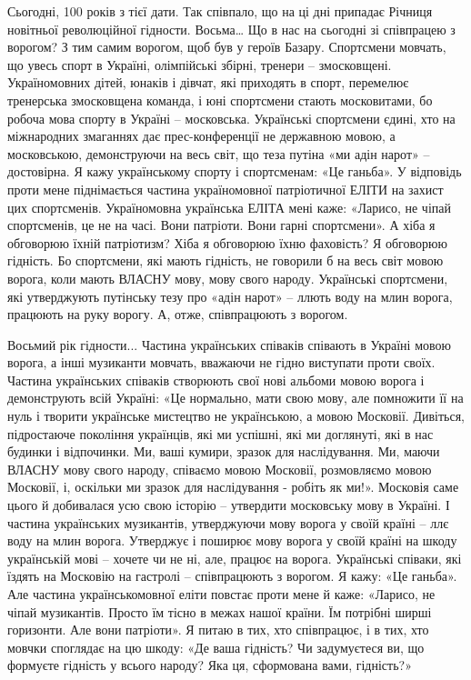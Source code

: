 Сьогодні, 100 років з тієї дати. Так співпало, що на ці дні припадає Річниця
новітньої революційної гідности. Восьма… Що в нас на сьогодні зі співпрацею з
ворогом? З тим самим ворогом, щоб був у героїв Базару. Спортсмени мовчать, що
увесь спорт в Україні, олімпійські збірні, тренери – змосковщені. Україномовних
дітей, юнаків і дівчат, які приходять в спорт, перемелює тренерська змосковщена
команда, і юні спортсмени стають московитами, бо робоча мова спорту в Україні –
московська. Українські спортсмени єдині, хто на міжнародних змаганнях дає
прес-конференції не державною мовою, а московською, демонструючи на весь світ,
що теза путіна «ми адін нарот» – достовірна. Я кажу українському спорту і
спортсменам: «Це ганьба». У відповідь проти мене піднімається частина
україномовної патріотичної ЕЛІТИ на захист цих спортсменів. Україномовна
українська ЕЛІТА мені каже: «Ларисо, не чіпай спортсменів, це не на часі. Вони
патріоти. Вони гарні спортсмени». А хіба я обговорюю їхній патріотизм? Хіба я
обговорюю їхню фаховість? Я обговорюю гідність. Бо спортсмени, які мають
гідність, не говорили б на весь світ мовою ворога, коли мають ВЛАСНУ мову, мову
свого народу. Українські спортсмени, які утверджують путінську тезу про «адін
нарот» – ллють воду на млин ворога, працюють на руку ворогу. А, отже,
співпрацюють з ворогом. 

Восьмий рік гідности... Частина українських співаків співають в Україні мовою
ворога, а інші музиканти мовчать, вважаючи не гідно виступати проти своїх.
Частина українських співаків створюють свої нові альбоми мовою ворога і
демонструють всій Україні: «Це нормально, мати свою мову, але помножити її на
нуль і творити українське мистецтво не українською, а  мовою Московії.
Дивіться, підростаюче покоління українців, які ми успішні, які ми доглянуті,
які в нас будинки і відпочинки. Ми, ваші кумири, зразок для наслідування. Ми,
маючи ВЛАСНУ мову свого народу, співаємо мовою Московії, розмовляємо мовою
Московії, і, оскільки ми зразок для наслідування - робіть як ми!». Московія
саме цього й добивалася усю свою історію – утвердити московську мову в Україні.
І частина українських музикантів, утверджуючи мову ворога у своїй країні – ллє
воду на млин ворога. Утверджує і поширює мову ворога у своїй країні на шкоду
українській мові – хочете чи не ні, але, працює на ворога. Українські співаки,
які їздять на Московію на гастролі – співпрацюють з ворогом.  Я кажу: «Це
ганьба». Але частина українськомовної еліти повстає проти мене й каже: «Ларисо,
не чіпай музикантів. Просто їм тісно в межах нашої країни. Їм потрібні ширші
горизонти. Але вони патріоти». Я питаю в тих, хто співпрацює, і в тих, хто
мовчки споглядає на цю шкоду: «Де ваша гідність? Чи задумуєтеся ви, що формуєте
гідність у всього народу? Яка ця, сформована вами, гідність?» 

